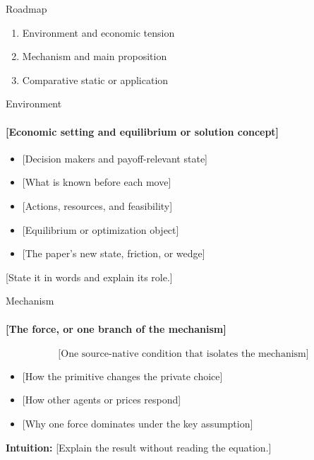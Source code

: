 \documentclass[11pt, aspectratio=169]{beamer}
\begin{document}
\begin{frame}{Roadmap}
  \begin{enumerate}\setlength{\itemsep}{1.1em}
    \item Environment and economic tension
    \item Mechanism and main proposition
    \item Comparative static or application
  \end{enumerate}
\end{frame}

\begin{frame}{Environment}
  \framesubtitle{[Economic setting and equilibrium or solution concept]}
  \medskip
  \begin{itemize}\setlength{\itemsep}{0.64em}
    \item {} [Decision makers and payoff-relevant state]
    \item {} [What is known before each move]
    \item {} [Actions, resources, and feasibility]
    \item {} [Equilibrium or optimization object]
    \item {} \textcolor{cNewObject}{[The paper's new state, friction, or wedge]}
  \end{itemize}

  \bigskip
   [State it in words and explain its role.]
  \hypertarget{main:assumption}{}%
\end{frame}

\begin{frame}{Mechanism}
  \framesubtitle{[The force, or one branch of the mechanism]}
  \medskip
  \[
    \text{[One source-native condition that isolates the mechanism]}
  \]
  \begin{itemize}\setlength{\itemsep}{0.58em}
    \item \textcolor{cChannelA}{} [How the primitive changes the private choice]
    \item \textcolor{cChannelB}{} [How other agents or prices respond]
    \item {} [Why one force dominates under the key assumption]
  \end{itemize}

  \medskip
  \textbf{Intuition:} [Explain the result without reading the equation.]
\end{frame}
\end{document}

